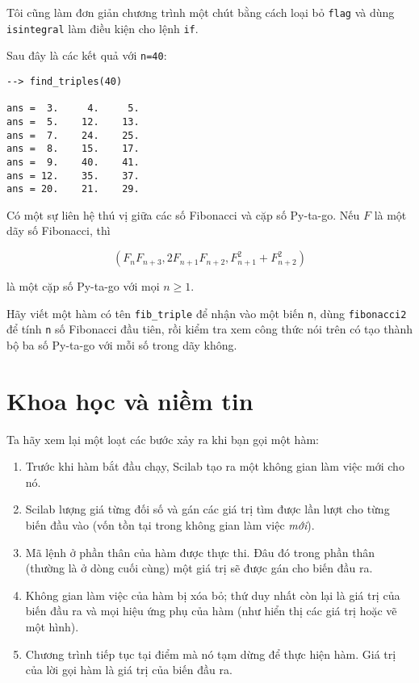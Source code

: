 \documentclass[12pt]{book}
\begin{document}
Tôi cũng làm đơn giản chương trình một chút bằng cách loại bỏ
{\tt flag} và dùng {\tt isintegral} làm điều kiện cho lệnh
{\tt if}.

Sau đây là các kết quả với {\tt n=40}:

\begin{verbatim}
--> find_triples(40)

ans =  3.     4.     5.
ans =  5.    12.    13.
ans =  7.    24.    25.
ans =  8.    15.    17.
ans =  9.    40.    41.
ans = 12.    35.    37.
ans = 20.    21.    29.
\end{verbatim}

Có một sự liên hệ thú vị giữa các số Fibonacci và cặp số
Py-ta-go. Nếu $F$ là một dãy số Fibonacci, thì

\[ (F_n F_{n+3}, 2 F_{n+1} F_{n+2}, F_{n+1}^2 + F_{n+2}^2 ) \]

là một cặp số Py-ta-go với mọi $n \ge 1$.

\begin{ex}
Hãy viết một hàm có tên \verb#fib_triple# để nhận vào một
biến {\tt n}, dùng {\tt fibonacci2} để tính
{\tt n} số Fibonacci đầu tiên, rồi kiểm tra xem công thức
nói trên có tạo thành bộ ba số Py-ta-go với mỗi số trong 
dãy không.
\end{ex}



\section{Khoa học và niềm tin}

Ta hãy xem lại một loạt các bước xảy ra khi bạn gọi một hàm:

\begin{enumerate}

\item Trước khi hàm bắt đầu chạy, Scilab tạo ra một không gian
làm việc mới cho nó.

\item Scilab lượng giá từng đối số và gán các giá trị tìm được
lần lượt cho từng biến đầu vào (vốn tồn tại trong không gian
làm việc {\em mới}).

\item Mã lệnh ở phần thân của hàm được thực thi. Đâu đó trong 
phần thân (thường là ở dòng cuối cùng) một giá trị sẽ được gán
cho biến đầu ra.

\item Không gian làm việc của hàm bị xóa bỏ; thứ duy nhất 
còn lại là giá trị của biến đầu ra và mọi hiệu ứng phụ của hàm
(như hiển thị các giá trị hoặc vẽ một hình).

\item Chương trình tiếp tục tại điểm mà nó tạm dừng để thực
hiện hàm. Giá trị của lời gọi hàm là giá trị của biến đầu ra.

\end{enumerate}
\end{document}
